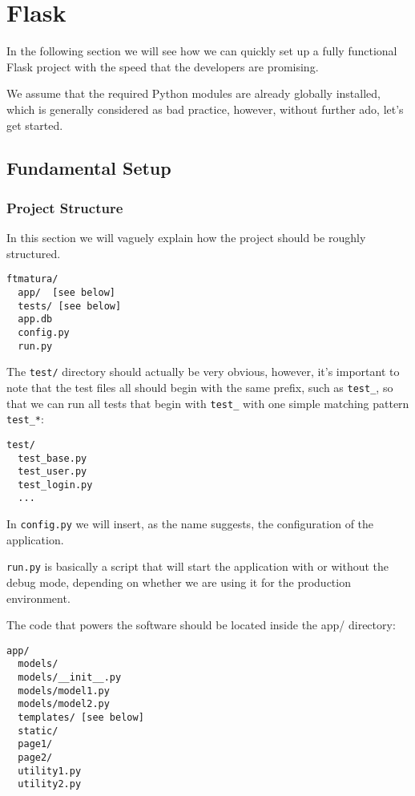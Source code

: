 \documentclass[../main/main.tex]{subfiles}
\begin{document}
\section{Flask}  

In the following section we will see how we can quickly set up a fully
functional Flask project with the speed that the developers are
promising.

We assume that the required Python modules are already globally
installed, which is generally considered as bad practice, however,
without further ado, let's get started.

\subsection{Fundamental Setup}

\subsubsection{Project Structure}

In this section we will vaguely explain how the project should be
roughly structured.

\begin{lstlisting}
ftmatura/
  app/  [see below]
  tests/ [see below]
  app.db
  config.py
  run.py
\end{lstlisting}

The \lstinline|test/| directory should actually be very obvious,
however, it's important to note that the test files all should begin
with the same prefix, such as \lstinline|test_|, so that we can run
all tests that begin with \lstinline|test_| with one simple matching
pattern \lstinline|test_*|: 

\begin{lstlisting}
test/
  test_base.py
  test_user.py
  test_login.py
  ...
\end{lstlisting}

In \lstinline|config.py| we will insert, as the name suggests, the
configuration of the application. 

\lstinline|run.py| is basically a script that will start the
application with or without the debug mode, depending on whether we
are using it for the production environment. 

The code that powers the software should be located inside the app/
directory:

\begin{lstlisting}
app/
  models/
  models/__init__.py
  models/model1.py
  models/model2.py
  templates/ [see below]
  static/ 
  page1/
  page2/ 
  utility1.py
  utility2.py
\end{lstlisting}
\end{document}
